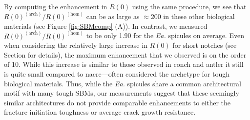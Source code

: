 \documentclass[12pt,onecolumn]{article}
\makeatletter
\DeclareRobustCommand*{\nameref}[1]{%
      \emph{\myorg@nameref{#1}}%
    }%
\newcommand{\EA}{\textit{Ea.\@}\xspace}
\makeatother
\begin{document}
By computing the enhancement in $R(0)$ using the same procedure, we see that $R(0)^{(\mathrm{arch})}/R(0)^{(\mathrm{hom})}$ can be as large as $\approx$200 in these other biological materials (see Figure \ref{fig:SBMcomp} (A)). In contrast, we measured $R(0)^{(\mathrm{arch})}/R(0)^{(\mathrm{hom})}$ to be only 1.90 for the \EA spicules on average. Even when considering the relatively large increase in $R(0)$ for short notches (see Section \nameref{sec:Gc} for details), the maximum enhancement that we observed is on the order of 10. While this increase is similar to those observed in conch and antler it still is quite small compared to nacre---often considered the archetype for tough biological materials. Thus, while the \EA spicules share a common architectural motif with many tough SBMs, our measurements suggest that these seemingly similar architectures do not provide comparable enhancements to either the fracture initiation toughness or average crack growth resistance.
\end{document}
